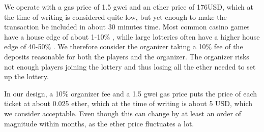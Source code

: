 We operate with a gas price of 1.5 gwei and an ether price of 176USD, which at the time of writing is considered quite low, but yet enough to make the transaction be included in about 30 minutes time. Most common casino games have a house edge of about 1-10\% \cite{walsh_houses_nodate}, while large lotteries often have a higher house edge of 40-50\% \cite{shackleford_house_nodate}. We therefore consider the organizer taking a 10\% fee of the deposits reasonable for both the players and the organizer. The organizer risks not enough players joining the lottery and thus losing all the ether needed to set up the lottery. 

In our design, a 10\% organizer fee and a 1.5 gwei gas price puts the price of each ticket at about 0.025 ether, which at the time of writing is about 5 USD, which we consider acceptable. Even though this can change by at least an order of magnitude within months, as the ether price fluctuates a lot. 
